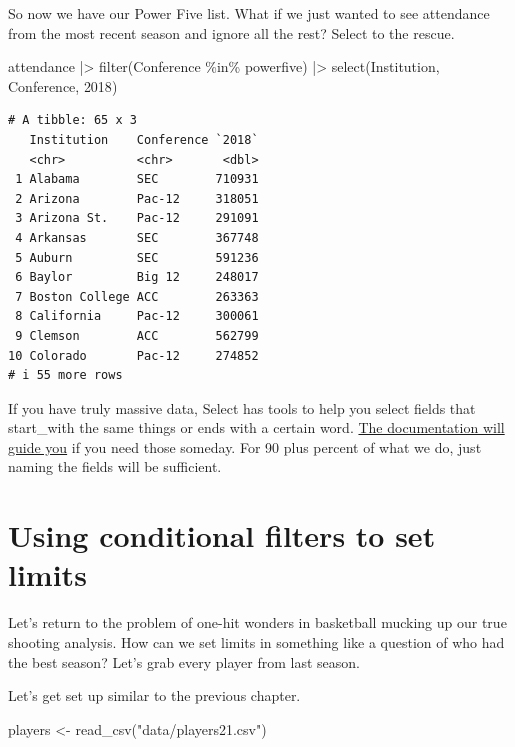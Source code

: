 \documentclass[
  letterpaper,
  DIV=11,
  numbers=noendperiod]{scrreprt}
\newenvironment{Shaded}{\begin{snugshade}}{\end{snugshade}}
\newcommand{\AttributeTok}[1]{\textcolor[rgb]{0.40,0.45,0.13}{#1}}
\newcommand{\FunctionTok}[1]{\textcolor[rgb]{0.28,0.35,0.67}{#1}}
\newcommand{\NormalTok}[1]{\textcolor[rgb]{0.00,0.23,0.31}{#1}}
\newcommand{\OtherTok}[1]{\textcolor[rgb]{0.00,0.23,0.31}{#1}}
\newcommand{\SpecialCharTok}[1]{\textcolor[rgb]{0.37,0.37,0.37}{#1}}
\newcommand{\StringTok}[1]{\textcolor[rgb]{0.13,0.47,0.30}{#1}}
\begin{document}
So now we have our Power Five list. What if we just wanted to see
attendance from the most recent season and ignore all the rest? Select
to the rescue.

\begin{Shaded}
\begin{Highlighting}[]
\NormalTok{attendance }\SpecialCharTok{|\textgreater{}} \FunctionTok{filter}\NormalTok{(Conference }\SpecialCharTok{\%in\%}\NormalTok{ powerfive) }\SpecialCharTok{|\textgreater{}} \FunctionTok{select}\NormalTok{(Institution, Conference, }\StringTok{\textasciigrave{}}\AttributeTok{2018}\StringTok{\textasciigrave{}}\NormalTok{)}
\end{Highlighting}
\end{Shaded}

\begin{verbatim}
# A tibble: 65 x 3
   Institution    Conference `2018`
   <chr>          <chr>       <dbl>
 1 Alabama        SEC        710931
 2 Arizona        Pac-12     318051
 3 Arizona St.    Pac-12     291091
 4 Arkansas       SEC        367748
 5 Auburn         SEC        591236
 6 Baylor         Big 12     248017
 7 Boston College ACC        263363
 8 California     Pac-12     300061
 9 Clemson        ACC        562799
10 Colorado       Pac-12     274852
# i 55 more rows
\end{verbatim}

If you have truly massive data, Select has tools to help you select
fields that start\_with the same things or ends with a certain word.
\href{https://dplyr.tidyverse.org/reference/select.html}{The
documentation will guide you} if you need those someday. For 90 plus
percent of what we do, just naming the fields will be sufficient.

\hypertarget{using-conditional-filters-to-set-limits}{%
\section{Using conditional filters to set
limits}\label{using-conditional-filters-to-set-limits}}

Let's return to the problem of one-hit wonders in basketball mucking up
our true shooting analysis. How can we set limits in something like a
question of who had the best season? Let's grab every player from last
season.

Let's get set up similar to the previous chapter.

\begin{Shaded}
\begin{Highlighting}[]
\NormalTok{players }\OtherTok{\textless{}{-}} \FunctionTok{read\_csv}\NormalTok{(}\StringTok{"data/players21.csv"}\NormalTok{)}
\end{Highlighting}
\end{Shaded}
\end{document}
